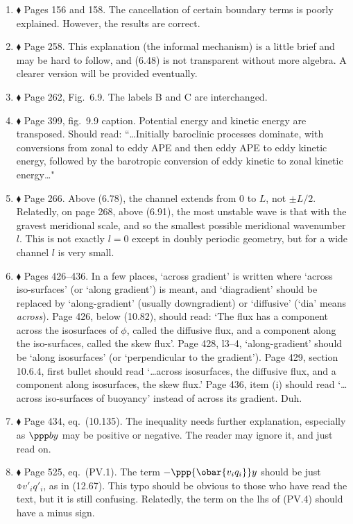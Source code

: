 \documentclass[10pt]{article}
\newcommand{\eq}{eq.\ } \newcommand{\Eq}{Eq.\ }
\renewcommand{\star}{\ensuremath{\blacklozenge} }
\begin{document}
\begin{enumerate}

\item \star \label{cancel} Pages 156 and 158. The cancellation of certain boundary terms is poorly explained. However, the results are correct. 

\item \star \label{informal} Page 258. This explanation (the informal mechanism) is a little brief and may be hard to follow, and (6.48) is not transparent without more algebra. A clearer version will be provided eventually. 

\item \star \label{eadyschem} Page 262, Fig.\ 6.9. The labels {\sf B} and {\sf C} are interchanged. 

\item \star \label{simmhosk} Page 399, fig.\ 9.9 caption.  Potential energy and kinetic energy are transposed. Should read: ``\ldots Initially baroclinic processes dominate, with conversions from zonal to eddy APE and then eddy APE to eddy kinetic energy, followed by the barotropic conversion of eddy kinetic to zonal kinetic energy\ldots"

\item \star \label{channel} Page 266. Above (6.78), the channel extends from $0$ to $L$, not $\pm L/2$. Relatedly, on page 268, above (6.91), the most unstable wave is that with the gravest meridional scale, and so the smallest possible meridional wavenumber $l$. This is not exactly $l=0$ except in doubly periodic geometry, but for a wide channel $l$ is very small.

\item \star Pages 426--436. In a few places, `across gradient' is written where `across iso-surfaces' (or `along gradient') is meant, and  `diagradient' should be replaced by `along-gradient' (usually downgradient) or `diffusive' (`dia' means \emph{across}). Page 426, below (10.82), should read: `The flux has a component across the isosurfaces of $\phi$, called the diffusive flux, and a component along the iso-surfaces, called the skew flux'. Page 428, l3--4, `along-gradient' should be `along isosurfaces' (or `perpendicular to the gradient'). Page 429, section 10.6.4, first bullet should read `\ldots across isosurfaces, the diffusive flux, and a component along isosurfaces, the skew flux.'  Page 436, item (i) should read `\ldots across iso-surfaces of buoyancy' instead of across its gradient. Duh.

\item \star Page 434, \eq (10.135). The inequality needs further explanation, especially as $\ppp by $ may be positive or negative.  The reader may ignore it, and just read on.

\item \star Page 525, \eq (PV.1). The term $-\ppp{\obar{v_i q_i}}y$ should be just $\obar{v'_i q'_i}$, as in (12.67). This typo should be obvious to those who have read the text, but it is still confusing. Relatedly, the term on the lhs of (PV.4) should have a minus sign.

\end{enumerate}
\end{document}
